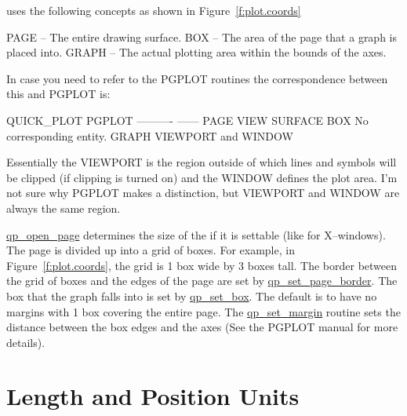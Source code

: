\quickplot uses the following concepts as shown in Figure~\ref{f:plot.coords}
\begin{example}
  PAGE  -- The entire drawing surface.
  BOX   -- The area of the page that a graph is placed into.
  GRAPH -- The actual plotting area within the bounds of the axes.
\end{example}
In case you need to refer to the PGPLOT routines the correspondence
between this and PGPLOT is:
\begin{example}
  QUICK_PLOT    PGPLOT
  ----------    ------
  PAGE          VIEW SURFACE
  BOX           No corresponding entity.
  GRAPH         VIEWPORT and WINDOW
\end{example}
Essentially the VIEWPORT is the region outside of which lines and symbols
will be clipped (if clipping is turned on) and the WINDOW defines the
plot area. I'm not sure why PGPLOT makes a distinction, but VIEWPORT and
WINDOW are always the same region.

\hyperref[r:qp.open.page]{qp_open_page} determines the size of the  if it is
settable (like for X--windows). The page is divided up into a grid of
boxes. For example, in Figure~\ref{f:plot.coords}, the grid is 1 box
wide by 3 boxes tall. The border between the grid of boxes and the
edges of the page are set by \hyperref[r:qp.set.page.border]{qp_set_page_border}.  The box that
the graph falls into is set by \hyperref[r:qp.set.box]{qp_set_box}. The default is to
have no margins with 1 box covering the entire page. The
\hyperref[r:qp.set.margin]{qp_set_margin} routine sets the distance between the box edges
and the axes (See the PGPLOT manual for more details).


\section{Length and Position Units}
\label{s:plot.units}


